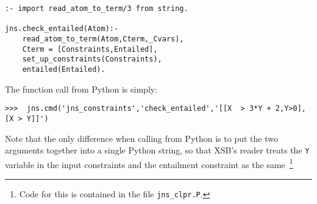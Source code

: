 \begin{example}
{\small
\begin{verbatim}
:- import read_atom_to_term/3 from string.

jns.check_entailed(Atom):-
    read_atom_to_term(Atom,Cterm,_Cvars),
    Cterm = [Constraints,Entailed],
    set_up_constraints(Constraints),
    entailed(Entailed).
\end{verbatim}
}

The function call from Python is simply:

\begin{verbatim}
>>>  jns.cmd('jns_constraints','check_entailed','[[X  > 3*Y + 2,Y>0],[X > Y]]')
\end{verbatim}
\noindent
Note that the only difference when calling from Python is to put the
two arguments together into a single Python string, so that XSB's
reader treats the {\tt Y} variable in the input constraints and the
entailment constraint as the same~\footnote{Code for this is contained
  in the file {\tt jns\_clpr.P}.}
\end{example}


%
%
%

